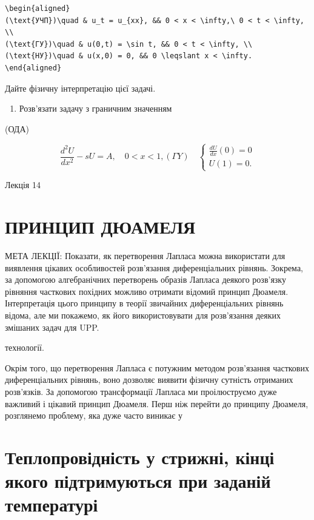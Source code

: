 \documentclass[
  ukrainian,
]{article}
\providecommand{\tightlist}{%
  \setlength{\itemsep}{0pt}\setlength{\parskip}{0pt}}
\begin{document}
\begin{verbatim}
\begin{aligned}
(\text{УЧП})\quad & u_t = u_{xx}, && 0 < x < \infty,\ 0 < t < \infty, \\
(\text{ГУ})\quad & u(0,t) = \sin t, && 0 < t < \infty, \\
(\text{НУ})\quad & u(x,0) = 0, && 0 \leqslant x < \infty.
\end{aligned}
\end{verbatim}

Дайте фізичну інтерпретацію цієї задачі.

\begin{enumerate}
\def\labelenumi{\arabic{enumi}.}
\setcounter{enumi}{3}
\tightlist
\item
  Розв'язати задачу з граничним значенням
\end{enumerate}

(ОДА)

\[
\frac{d^2U}{dx^2} - sU = A, \quad 0 < x < 1,
(\Gamma Y) \quad
\begin{cases} \frac{dU}{dx} (0) = 0 \\ U(1) = 0. \end{cases}
\]

Лекція 14

\section{ПРИНЦИП
ДЮАМЕЛЯ}\label{ux43fux440ux438ux43dux446ux438ux43f-ux434ux44eux430ux43cux435ux43bux44f}

МЕТА ЛЕКЦІЇ: Показати, як перетворення Лапласа можна використати для
виявлення цікавих особливостей розв'язання диференціальних рівнянь.
Зокрема, за допомогою алгебранічних перетворень образів Лапласа деякого
розв'язку рівняння часткових похідних можливо отримати відомий принцип
Дюамеля. Інтерпретація цього принципу в теорії звичайних диференціальних
рівнянь відома, але ми покажемо, як його використовувати для розв'язання
деяких змішаних задач для UPP.

технології.

Окрім того, що перетворення Лапласа є потужним методом розв'язання
часткових диференціальних рівнянь, воно дозволяє виявити фізичну
сутність отриманих розв'язків. За допомогою трансформації Лапласа ми
проілюструємо дуже важливий і цікавий принцип Дюамеля. Перш ніж перейти
до принципу Дюамеля, розглянемо проблему, яка дуже часто виникає у

\section{Теплопровідність у стрижні, кінці якого підтримуються при
заданій
температурі}\label{ux442ux435ux43fux43bux43eux43fux440ux43eux432ux456ux434ux43dux456ux441ux442ux44c-ux443-ux441ux442ux440ux438ux436ux43dux456-ux43aux456ux43dux446ux456-ux44fux43aux43eux433ux43e-ux43fux456ux434ux442ux440ux438ux43cux443ux44eux442ux44cux441ux44f-ux43fux440ux438-ux437ux430ux434ux430ux43dux456ux439-ux442ux435ux43cux43fux435ux440ux430ux442ux443ux440ux456}
\end{document}
